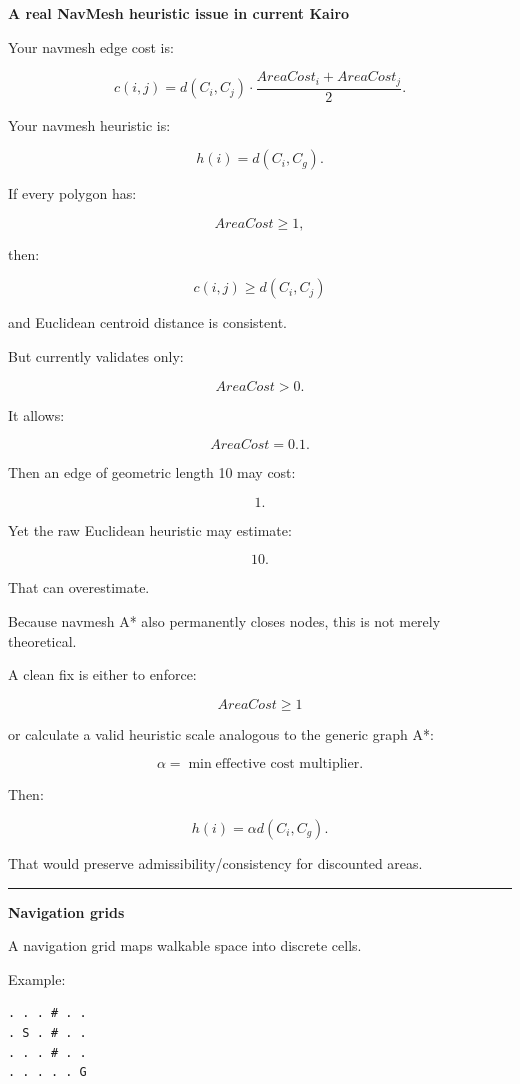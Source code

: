 \textbf{A real NavMesh heuristic issue in current Kairo}

Your navmesh edge cost is:

\[
c(i,j)
=
d(C_i,C_j)
\cdot
\frac{
AreaCost_i+AreaCost_j
}{2}.
\]

Your navmesh heuristic is:

\[
h(i)
=
d(C_i,C_g).
\]

If every polygon has:

\[
AreaCost\ge1,
\]

then:

\[
c(i,j)\ge d(C_i,C_j)
\]

and Euclidean centroid distance is consistent.

But  currently validates only:

\[
AreaCost>0.
\]

It allows:

\[
AreaCost=0.1.
\]

Then an edge of geometric length 10 may cost:

\[
1.
\]

Yet the raw Euclidean heuristic may estimate:

\[
10.
\]

That can overestimate.

Because navmesh A* also permanently closes nodes, this is not merely theoretical.

A clean fix is either to enforce:

\[
AreaCost\ge1
\]

or calculate a valid heuristic scale analogous to the generic graph A*:

\[
\alpha
=
\min
\text{effective cost multiplier}.
\]

Then:

\[
h(i)
=
\alpha d(C_i,C_g).
\]

That would preserve admissibility/consistency for discounted areas.

\begin{center}\rule{0.5\linewidth}{0.5pt}\end{center}

\textbf{Navigation grids}

A navigation grid maps walkable space into discrete cells.

Example:

\begin{verbatim}
. . . # . .
. S . # . .
. . . # . .
. . . . . G
\end{verbatim}

